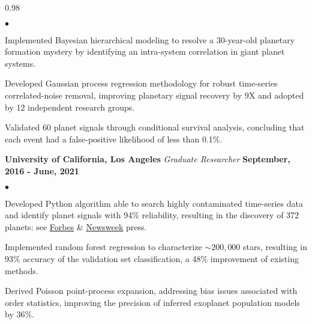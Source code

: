 \documentclass[margin,line, 12pt]{res}
\newenvironment{list2}{
  \begin{list}{$\bullet$}{%
      \setlength{\itemsep}{0.04in}
      \setlength{\parsep}{0.00in} \setlength{\parskip}{0in}
      \setlength{\topsep}{0.0in} \setlength{\partopsep}{0in}
      \setlength{\leftmargin}{0.2in}}}{\end{list}}
\begin{document}
\begin{spacing}{0.98}
\begin{resume}
\begin{list2}
	\item Implemented Bayesian hierarchical modeling to resolve a 30-year-old planetary formation mystery by identifying an intra-system correlation in giant planet systems.
	
	\item Developed Gaussian process regression methodology for robust time-series correlated-noise removal, improving planetary signal recovery by 9X and adopted by 12 independent research groups.
	
	\item Validated 60 planet signals through conditional survival analysis, concluding that each event had a false-positive likelihood of less than 0.1\%.
	
	


	
	\end{list2}		

\vspace*{-0.08in}
\textbf{University of California, Los Angeles} \newline
\textit{Graduate Researcher} \hfill \textbf{September, 2016 - June, 2021}\newline
	\begin{list2}
		\vspace*{-5mm}
	\item Developed Python algorithm able to search highly contaminated time-series data and identify planet signals with 94\% reliability, resulting in the discovery of 372 planets: see \href{https://www.forbes.com/sites/jamiecartereurope/2021/06/11/we-found-372-new-alien-planets-using-a-long-dead-telescope-say-scientists/}{Forbes} \& \href{https://www.newsweek.com/astronomers-discover-366-new-worlds-gas-giants-kepler-k2-exoplanets-nasa-1653254}{Newsweek} press.
	
	\item Implemented random forest regression to characterize $\sim200,000$ stars, resulting in 93\% accuracy of the validation set classification, a 48\% improvement of existing methods.
	
	
	
	\item Derived Poisson point-process expansion, addressing bias issues associated with order statistics, improving the precision of inferred exoplanet population models by 36\%.
	

\end{list2}
\end{resume}
\end{spacing}
\end{document}
